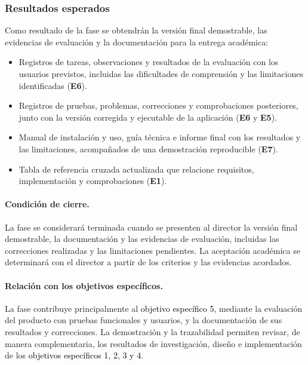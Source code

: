 \subsubsection{Resultados esperados}\label{sec:transicion-resultados}

Como resultado de la fase se obtendrán la versión final
demostrable, las evidencias de evaluación y la documentación
para la entrega académica:

\begin{itemize}
    \item Registros de tareas, observaciones y resultados de la
    evaluación con los usuarios previstos, incluidas las
    dificultades de comprensión y las limitaciones identificadas
    (\textbf{E6}).

    \item Registros de pruebas, problemas, correcciones y
    comprobaciones posteriores, junto con la versión corregida
    y ejecutable de la aplicación (\textbf{E6} y \textbf{E5}).

    \item Manual de instalación y uso, guía técnica e informe
    final con los resultados y las limitaciones, acompañados
    de una demostración reproducible (\textbf{E7}).

    \item Tabla de referencia cruzada actualizada que relacione
    requisitos, implementación y comprobaciones (\textbf{E1}).
\end{itemize}

\paragraph{Condición de cierre.}
La fase se considerará terminada cuando se presenten al director
la versión final demostrable, la documentación y las evidencias
de evaluación, incluidas las correcciones realizadas y las
limitaciones pendientes. La aceptación académica se determinará
con el director a partir de los criterios y las evidencias
acordados.

\paragraph{Relación con los objetivos específicos.}
La fase contribuye principalmente al \textcolor{black}{objetivo específico 5},
mediante la evaluación del producto con pruebas funcionales y
usuarios, y la documentación de sus resultados y correcciones.
La demostración y la trazabilidad permiten revisar, de manera
complementaria, los resultados de investigación, diseño e
implementación de los \textcolor{black}{objetivos específicos 1, 2, 3 y 4}.